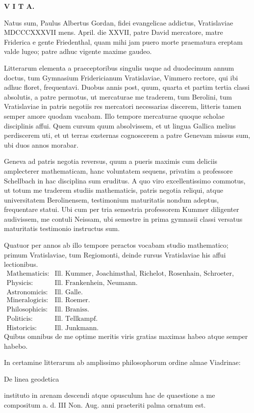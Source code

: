 \begingroup\small
\begin{center}
{\large\bfseries V I T A.}
\end{center}

Natus sum, Paulus Albertus Gordan, fidei evangelicae addictus, Vratislaviae MDCCCXXXVII mens. April. die XXVII, patre David mercatore, matre Friderica e gente Friedenthal, quam mihi jam puero morte praematura ereptam valde lugeo; patre adhuc vigente maxime gaudeo.

Litterarum elementa a praeceptoribus singulis usque ad duodecimum annum doctus, tum Gymnasium Fridericianum Vratislaviae, Vimmero rectore, qui ibi adhuc floret, frequentavi. Duobus annis post, quum, quarta et partim tertia classi absolutis, a patre permotus, ut mercaturae me traderem, tum Berolini, tum Vratislaviae in patris negotiis res mercatori necessarias discerem, litteris tamen semper amore quodam vacabam. Illo tempore mercaturae quoque scholae disciplinis affui. Quem cursum quum absolvissem, et ut lingua Gallica melius perdiscerem uti, et ut terras exsternas cognoscerem a patre Genevam missus sum, ubi duos annos morabar.

Geneva ad patris negotia reversus, quum a pueris maximis cum deliciis amplecterer mathematicam, hanc voluntatem sequens, privatim a professore Schellbach in hac disciplina sum eruditus. A quo viro excellentissimo commotus, ut totum me traderem studiis mathematicis, patris negotia reliqui, atque universitatem Berolinensem, testimonium maturitatis nondum adeptus, frequentare statui. Ubi cum per tria semestria professorem Kummer diligenter audivissem, me contuli Neissam, ubi semestre in prima gymnasii classi versatus maturitatis testimonio instructus sum.

Quatuor per annos ab illo tempore peractos vocabam studio mathematico; primum Vratislaviae, tum Regiomonti, deinde rursus Vratislaviae his affui lectionibus.
\[
\begin{array}{ll}
\text{Mathematicis:}& \text{Ill. Kummer, Joachimsthal, Richelot, Rosenhain, Schroeter, Galle.}\\
\text{Physicis:}& \text{Ill. Frankenhein, Neumann.}\\
\text{Astronomicis:}& \text{Ill. Galle.}\\
\text{Mineralogicis:}& \text{Ill. Roemer.}\\
\text{Philosophicis:}& \text{Ill. Braniss.}\\
\text{Politicis:}& \text{Ill. Tellkampf.}\\
\text{Historicis:}& \text{Ill. Junkmann.}
\end{array}
\]
Quibus omnibus de me optime meritis viris gratias maximas habeo atque semper habebo.

In certamine litterarum ab amplissimo philosophorum ordine almae Viadrinae:
\begin{center}
\textbullet De linea geodetica\textbullet
\end{center}
instituto in arenam descendi atque opusculum hac de quaestione a me compositum a. d. III Non. Aug. anni praeteriti palma ornatum est.

\GordanOrnament
\endgroup
